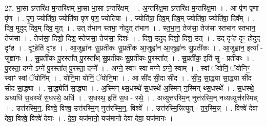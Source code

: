 \documentclass[17pt]{extarticle}
\begin{document}
27. भा॒सा ऽन्तरि॑क्ष म॒न्तरि॑क्षम् भा॒सा भा॒सा ऽन्तरि॑क्षम् । . अ॒न्तरि॑क्ष॒मा ऽन्तरि॑क्ष म॒न्तरि॑क्ष॒मा । . आ पृ॑ण पृ॒णा पृ॑ण । . पृ॒ण॒ ज्योति॑षा॒ ज्योति॑षा पृण पृण॒ ज्योति॑षा । . ज्योति॑षा॒ दिव॒म् दिव॒म् ज्योति॑षा॒ ज्योति॑षा॒ दिव᳚म् । . दिव॒ मुदुद् दिव॒म् दिव॒ मुत् । . उत् त॑भान स्तभा॒ नोदुत् त॑भान । . स्त॒भा॒न॒ तेज॑सा॒ तेज॑सा स्तभान स्तभान॒ तेज॑सा । . तेज॑सा॒ दिशो॒ दिश॒ स्तेज॑सा॒ तेज॑सा॒ दिशः॑ । . दिश॒ उदुद् दिशो॒ दिश॒ उत् । . उद् दृꣳ॑ह दृꣳ॒॒ होदुद् दृꣳ॑ह । . दृꣳ॒॒हेति॑ दृꣳह । . आ॒जुह्वा॑नः सु॒प्रती॑कः सु॒प्रती॑क आ॒जुह्वा॑न आ॒जुह्वा॑नः सु॒प्रती॑कः । . आ॒जुह्वा॑न॒ इत्या᳚ - जुह्वा॑नः । . सु॒प्रती॑कः पु॒रस्ता᳚त् पु॒रस्ता᳚थ् सु॒प्रती॑कः सु॒प्रती॑कः पु॒रस्ता᳚त् । . सु॒प्रती॑क॒ इति॑ सु - प्रती॑कः । . पु॒रस्ता॒ दग्ने ऽग्ने॑ पु॒रस्ता᳚त् पु॒रस्ता॒ दग्ने᳚ । . अग्ने॒ स्वाꣳ स्वा मग्ने ऽग्ने॒ स्वाम् । . स्वां ॅयोनिं॒ ॅयोनिꣳ॒॒ स्वाꣳ स्वां ॅयोनि᳚म् । . योनि॒मा योनिं॒ ॅयोनि॒मा । . आ सी॑द सी॒दा सी॑द । . सी॒द॒ सा॒द्ध्या सा॒द्ध्या सी॑द सीद सा॒द्ध्या । . सा॒द्ध्येति॑ सा॒द्ध्या । . अ॒स्मिन् थ्स॒धस्थे॑ स॒धस्थे॑ अ॒स्मिन् न॒स्मिन् थ्स॒धस्थे᳚ । . स॒धस्थे॒ अध्यधि॑ स॒धस्थे॑ स॒धस्थे॒ अधि॑ । . स॒धस्थ॒ इति॑ स॒ध - स्थे॒ । . अध्युत्त॑रस्मि॒न् नुत्त॑रस्मि॒न् नध्यध्युत्त॑रस्मिन्न् । . उत्त॑रस्मि॒न्॒. विश्वे॒ विश्व॒ उत्त॑रस्मि॒न् नुत्त॑रस्मि॒न्॒. विश्वे᳚ । . उत्त॑रस्मि॒न्नित्युत् - त॒र॒स्मि॒न्न् । . विश्वे॑ देवा देवा॒ विश्वे॒ विश्वे॑ देवाः । . दे॒वा॒ यज॑मानो॒ यज॑मानो देवा देवा॒ यज॑मानः । \newline
\end{document}
